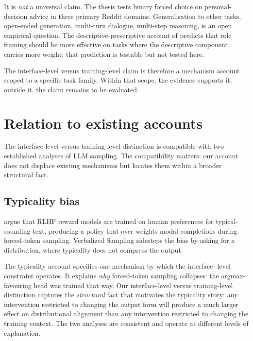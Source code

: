 It is \emph{not} a universal claim. The thesis tests binary forced
choice on personal-decision advice in three primary Reddit domains.
Generalisation to other tasks, open-ended generation, multi-turn
dialogue, multi-step reasoning, is an open empirical question. The
descriptive-prescriptive account of \citet{sivaprasad-2025-descriptive-prescriptive}
predicts that role framing should be more effective on tasks where
the descriptive component carries more weight; that prediction is
testable but not tested here.

The interface-level versus training-level claim is therefore a
mechanism account scoped to a specific task family. Within that scope,
the evidence supports it; outside it, the claim remains to be
evaluated.

\section{Relation to existing accounts}
\label{sec:disc_existing}

The interface-level versus training-level distinction is compatible
with two established analyses of LLM sampling. The compatibility
matters: our account does not displace existing mechanisms but
locates them within a broader structural fact.

\subsection{Typicality bias}
\label{sec:disc_typicality}

\citet{zhang-2025-verbalized-sampling} argue that RLHF reward models
are trained on human preferences for typical-sounding text, producing
a policy that over-weights modal completions during forced-token
sampling. Verbalized Sampling sidesteps the bias by asking for a
distribution, where typicality does not compress the output.

The typicality account specifies one mechanism by which the interface-
level constraint operates. It explains \emph{why} forced-token
sampling collapses: the argmax-favouring head was trained that way.
Our interface-level versus training-level distinction captures the
\emph{structural} fact that motivates the typicality story: any
intervention restricted to changing the output form will produce a
much larger effect on distributional alignment than any intervention
restricted to changing the training context. The two analyses are
consistent and operate at different levels of explanation.

